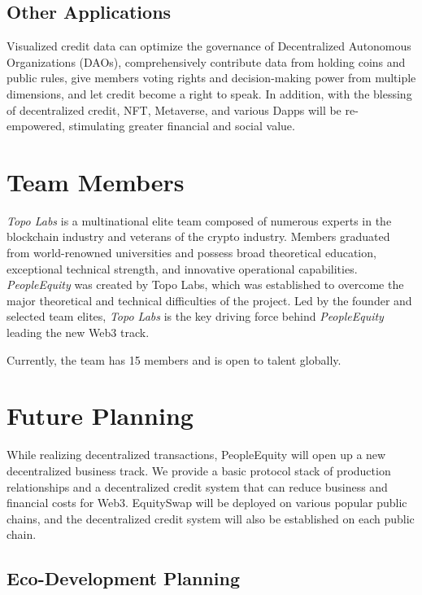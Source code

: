 \documentclass{article}
\begin{document}
\subsection{Other Applications}

Visualized credit data can optimize the governance of Decentralized Autonomous Organizations (DAOs), comprehensively contribute data from holding coins and public rules, give members voting rights and decision-making power from multiple dimensions, and let credit become a right to speak. In addition, with the blessing of decentralized credit, NFT, Metaverse, and various Dapps will be re-empowered, stimulating greater financial and social value.

\section{Team Members}

\emph{Topo Labs} is a multinational elite team composed of numerous experts in the blockchain industry and veterans of the crypto industry. Members graduated from world-renowned universities and possess broad theoretical education, exceptional technical strength, and innovative operational capabilities. \emph{PeopleEquity} was created by Topo Labs, which was established to overcome the major theoretical and technical difficulties of the project. Led by the founder and selected team elites, \emph{Topo Labs} is the key driving force behind \emph{PeopleEquity} leading the new Web3 track.

Currently, the team has 15 members and is open to talent globally.

\section{Future Planning}

While realizing decentralized transactions, PeopleEquity will open up a new decentralized business track. We provide a basic protocol stack of production relationships and a decentralized credit system that can reduce business and financial costs for Web3. EquitySwap will be deployed on various popular public chains, and the decentralized credit system will also be established on each public chain.

\subsection{Eco-Development Planning}
\end{document}
